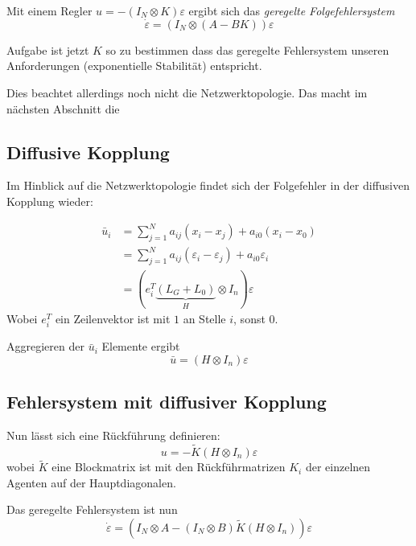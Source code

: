 Mit einem Regler $u=-(I_N \otimes K)\varepsilon$  ergibt sich das
\emph{geregelte Folgefehlersystem}
\begin{equation}
    \dot{\varepsilon} = (I_N \otimes (A-BK))\varepsilon
\end{equation}

Aufgabe ist jetzt $K$ so zu bestimmen dass das geregelte Fehlersystem unseren
Anforderungen (exponentielle Stabilität) entspricht.

Dies beachtet allerdings noch nicht die Netzwerktopologie.
Das macht im nächsten Abschnitt die

\subsection{Diffusive Kopplung}
Im Hinblick auf die Netzwerktopologie findet sich der Folgefehler in der
diffusiven Kopplung wieder:

\begin{align}
    \bar{u}_i &= \sum_{j=1}^N a_{ij} (x_i-x_j) + a_{i0}(x_i-x_0) \\
    &= \sum_{j=1}^N a_{ij} (\varepsilon_i - \varepsilon_j) + a_{i0} \varepsilon_i \\
    &= \left(e_i^T\underbrace{(L_G+L_0)}_H \otimes I_n\right)\varepsilon
\end{align}
Wobei $e_i^T$ ein Zeilenvektor ist mit $1$ an Stelle $i$, sonst $0$.

Aggregieren der $\bar{u}_i$ Elemente ergibt
\begin{equation}
    \bar{u} = (H \otimes I_n)\varepsilon
\end{equation}

\subsection{Fehlersystem mit diffusiver Kopplung}
Nun lässt sich eine Rückführung definieren:
\begin{equation}
    u=-\tilde{K}(H\otimes I_n)\varepsilon
\end{equation}
wobei $\tilde{K}$ eine Blockmatrix ist mit den Rückführmatrizen $K_i$ der einzelnen
Agenten auf der Hauptdiagonalen.

Das geregelte Fehlersystem ist nun
\begin{equation}
    \dot{\varepsilon} = (I_N \otimes A - (I_N \otimes B) \tilde{K}(H \otimes I_n))\varepsilon
    \label{eqn:fehlersystem_geregelt_ktilde}
\end{equation}

